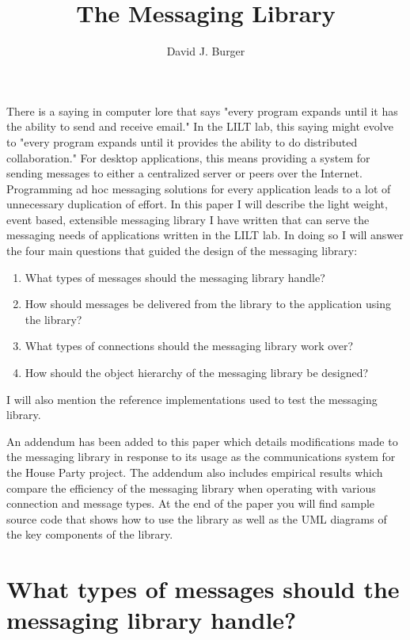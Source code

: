 \documentclass{article}
\author{David J. Burger}
\title{The Messaging Library}
\begin{document}
\maketitle

There is a saying in computer lore that says "every program expands
until it has the ability to send and receive email."  In the LILT lab,
this saying might evolve to "every program expands until it provides
the ability to do distributed collaboration."  For desktop
applications, this means providing a system for sending messages to
either a centralized server or peers over the Internet.  Programming
ad hoc messaging solutions for every application leads to a lot of
unnecessary duplication of effort.  In this paper I will describe the
light weight, event based, extensible messaging library I have written
that can serve the messaging needs of applications written in the LILT
lab.  In doing so I will answer the four main questions that guided
the design of the messaging library:

\begin{enumerate}
\item What types of messages should the messaging library handle?
\item How should messages be delivered from the library to the
      application using the library?
\item What types of connections should the messaging library work
      over?
\item How should the object hierarchy of the messaging library be
      designed?
\end{enumerate}

I will also mention the reference implementations used to test the
messaging library.

An addendum has been added to this paper which details modifications
made to the messaging library in response to its usage as the
communications system for the House Party project.  The addendum also
includes empirical results which compare the efficiency of the
messaging library when operating with various connection and message
types.  At the end of the paper you will find sample source code that
shows how to use the library as well as the UML diagrams of the key
components of the library.

\section{What types of messages should the messaging library handle?}
\end{document}
